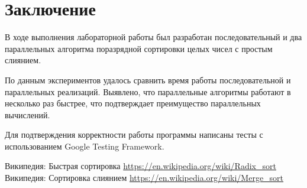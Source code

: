 \documentclass{report}
\begin{document}
\section*{Заключение}
В ходе выполнения лабораторной работы был разработан последовательный и два параллельных алгоритма поразрядной сортировки целых чисел с простым слиянием.
\par По данным экспериментов удалось сравнить время работы последовательной и параллельных реализаций. Выявлено, что параллельные алгоритмы работают в несколько раз быстрее, что подтверждает преимущество параллельных вычислений.
\par Для подтверждения корректности работы программы написаны тесты с использованием Google Testing Framework.
\newpage

\begin{thebibliography}{1}
 Википедия: Быстрая сортировка  \url {https://en.wikipedia.org/wiki/Radix_sort} 
 Википедия: Сортировка слиянием \url {https://en.wikipedia.org/wiki/Merge_sort}
\end{thebibliography}
\newpage

\end{document}
